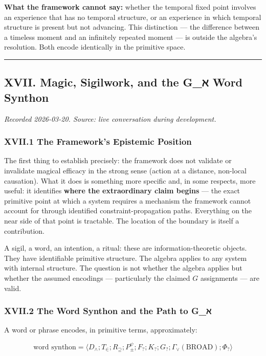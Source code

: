 \documentclass[12pt,a4paper]{article}
\begin{document}
\textbf{What the framework cannot say:} whether the temporal fixed point involves an experience that has no temporal structure, or an experience in which temporal structure is present but not advancing. This distinction --- the difference between a timeless moment and an infinitely repeated moment --- is outside the algebra's resolution. Both encode identically in the primitive space.

\begin{center}
\rule{0.5\textwidth}{0.4pt}
\end{center}

\subsection{XVII. Magic, Sigilwork, and the G\_ℵ Word Synthon}

\emph{Recorded 2026-03-20. Source: live conversation during development.}

\subsubsection{XVII.1 The Framework's Epistemic Position}

The first thing to establish precisely: the framework does not validate or invalidate magical efficacy in the strong sense (action at a distance, non-local causation). What it does is something more specific and, in some respects, more useful: it identifies \textbf{where the extraordinary claim begins} --- the exact primitive point at which a system requires a mechanism the framework cannot account for through identified constraint-propagation paths. Everything on the near side of that point is tractable. The location of the boundary is itself a contribution.

A sigil, a word, an intention, a ritual: these are information-theoretic objects. They have identifiable primitive structure. The algebra applies to any system with internal structure. The question is not whether the algebra applies but whether the assumed encodings --- particularly the claimed $G$ assignments --- are valid.

\subsubsection{XVII.2 The Word Synthon and the Path to G\_ℵ}

A word or phrase encodes, in primitive terms, approximately:

\[\text{word synthon} = \langle D_\wedge ; T_\in ; R_\supseteq ; P_{\pm}^\psi ; F_? ; K_? ; G_? ; \Gamma_\vee(\text{BROAD}) ; \Phi_? \rangle\]
\end{document}
